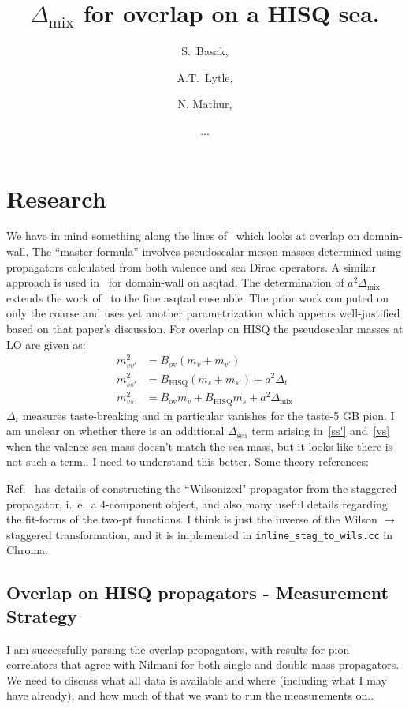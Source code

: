 \documentclass[11pt,a4paper]{article}
\title{\boldmath $\Delta_\text{mix}$ for overlap on a HISQ sea.}
\author{S.\ Basak,}
\author{A.T.\ Lytle,}
\author{N. Mathur,}
\author{...}
\begin{document}
\maketitle
\section{Research}
We have in mind something along the lines of~\cite{Lujan:2012wg} which looks at overlap
on domain-wall.  The ``master formula'' involves pseudoscalar meson masses determined
using propagators calculated from both valence and sea Dirac operators.
A similar approach is used in~\cite{Aubin:2008wk} for domain-wall on asqtad.
The determination of $a^2 \Delta_\text{mix}$ extends the work of~\cite{Orginos:2007tw} to the fine asqtad ensemble.
The prior work computed on only the coarse and uses yet another parametrization which 
appears well-justified based on that paper's discussion.
For overlap on HISQ the pseudoscalar
masses at LO are given as:
\begin{align}
m^2_{vv'} &= B_{\text{ov}} (m_v + m_{v'}) \\
m^2_{ss'} &= B_{\text{HISQ}}(m_s + m_{s'}) + a^2 \Delta_{t} \label{ss'}\\
m^2_{vs} &= B_{\text{ov}} m_v + B_{\text{HISQ}} m_s + a^2 \Delta_\text{mix} \label{vs}
\end{align}
$\Delta_t$ measures taste-breaking and in particular vanishes for the taste-5 GB pion.
I am unclear on whether there is an additional $\Delta_{\text{sea}}$ term
arising in~\eqref{ss'} and~\eqref{vs} when the valence sea-mass doesn't match the sea mass,
but it looks like there is not such a term.. I need to understand this better.
Some theory references:~\cite{Aubin:2003mg}\cite{Bar:2005tu}\cite{Chen:2006wf}

Ref.~\cite{Orginos:2007tw} has details of constructing the ``Wilsonized" propagator
from the staggered propagator, i.\ e.\ a 4-component object,
and also many useful details regarding the fit-forms of the two-pt functions.  I think is just the inverse
of the Wilson $\rightarrow$ staggered transformation, and it is implemented in {\tt inline\_stag\_to\_wils.cc} in Chroma.


\subsection{Overlap on HISQ propagators - Measurement Strategy}
I am successfully parsing the overlap propagators, with results for pion correlators that agree
with Nilmani for both single and double mass propagators.  We need to discuss what all data is available and where (including what I may have already), and how much of that we want to run the measurements on..
\end{document}
